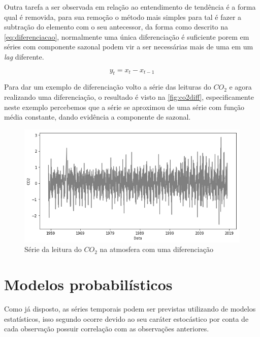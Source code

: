 \documentclass[
	12pt,
	oneside,
	a4paper,
	english,
	brazil
]{abntex2}
\begin{document}
Outra tarefa a ser observada em relação ao entendimento de tendência é a forma 
qual é removida, para sua remoção o método mais simples para tal é fazer a 
subtração do elemento com o seu antecessor, da forma como descrito na 
\autoref{eq:diferenciacao}, normalmente uma única diferenciação é suficiente 
porem em séries com componente sazonal podem vir a ser necessárias mais de uma 
em um \textit{lag} diferente.

\begin{equation}
    \label{eq:diferenciacao}
    y_t = x_t - x_{t-1}
\end{equation}

Para dar um exemplo de diferenciação volto a série das leituras do $CO_2$ e agora 
realizando uma diferenciação, o resultado é visto na \autoref{fig:co2diff}, 
especificamente neste exemplo percebemos que a série se aproximou de uma série 
com função média constante, dando evidência a componente de sazonal.

\begin{figure}
    \centering
    \caption{Série da leitura do $CO_2$ na atmosfera com uma 
    diferenciação}\label{fig:co2diff}
    \includegraphics[width=.6\linewidth]{images/co2_diff.png}
\end{figure}

%


\section{Modelos probabilísticos}

Como já disposto, as séries temporais podem ser previstas utilizando de modelos 
estatísticos, isso segundo  ocorre devido ao seu caráter 
estocástico por conta de cada observação possuir correlação com as observações 
anteriores.
\end{document}

